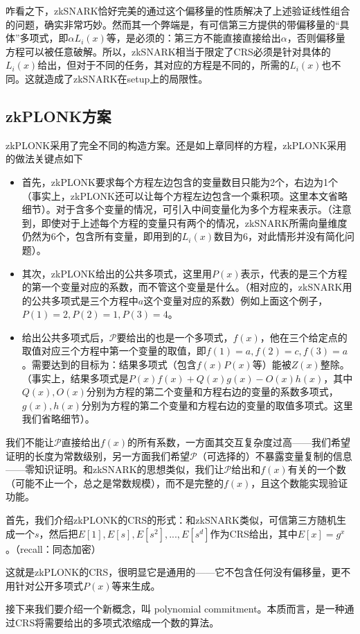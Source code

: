 \documentclass[12pt]{article}
\newcommand{\zk}{zkPLONK}
\newcommand{\pp}{$\mathcal{P}$}
\begin{document}
咋看之下，zkSNARK恰好完美的通过这个偏移量的性质解决了上述验证线性组合的问题，确实非常巧妙。然而其一个弊端是，有可信第三方提供的带偏移量的“具体”多项式，即$\alpha L_i(x)$等，是必须的：第三方不能直接直接给出$\alpha$，否则偏移量方程可以被任意破解。所以，zkSNARK相当于限定了CRS必须是针对具体的$L_i(x)$给出，但对于不同的任务，其对应的方程是不同的，所需的$L_i(x)$也不同。这就造成了zkSNARK在setup上的局限性。

\subsection{\zk 方案}
\zk 采用了完全不同的构造方案。还是如上章同样的方程，\zk 采用的做法关键点如下
\begin{itemize}
	\item 首先，\zk 要求每个方程左边包含的变量数目只能为2个，右边为1个（事实上，\zk 还可以让每个方程左边包含一个乘积项。这里本文省略细节）。对于含多个变量的情况，可引入中间变量化为多个方程来表示。（注意到，即使对于上述每个方程的变量只有两个的情况，zkSNARK所需向量维度仍然为6个，包含所有变量，即用到的$L_i(x)$数目为6，对此情形并没有简化问题）。
	\item 其次，\zk 给出的公共多项式，这里用$P(x)$表示，代表的是三个方程的第一个变量对应的系数，而不管这个变量是什么。（相对应的，zkSNARK用的公共多项式是三个方程中$a$这个变量对应的系数）例如上面这个例子，$P(1)=2,P(2)=1,P(3)=4$。
	\item 给出公共多项式后，\pp 要给出的也是一个多项式，$f(x)$，他在三个给定点的取值对应三个方程中第一个变量的取值，即$f(1)=a,f(2)=c,f(3)=a$。需要达到的目标为：结果多项式（包含$f(x)P(x)$等）能被$Z(x)$整除。（事实上，结果多项式是$P(x)f(x)+Q(x)g(x)-O(x)h(x)$，其中$Q(x),O(x)$分别为方程的第二个变量和方程右边的变量的系数多项式，$g(x),h(x)$分别为方程的第二个变量和方程右边的变量的取值多项式。这里我们省略细节）。
\end{itemize}
我们不能让\pp 直接给出$f(x)$的所有系数，一方面其交互复杂度过高——我们希望证明的长度为常数级别，另一方面我们希望\pp （可选择的）不暴露变量复制的信息——零知识证明。和zkSNARK的思想类似，我们让\pp 给出和$f(x)$有关的一个数（可能不止一个，总之是常数规模），而不是完整的$f(x)$，且这个数能实现验证功能。

首先，我们介绍\zk 的CRS的形式：和zkSNARK类似，可信第三方随机生成一个$s$，然后把$E[1],E[s],E[s^2],...,E[s^d]$作为CRS给出，其中$E[x]=g^x$。（recall：同态加密）

这就是\zk 的CRS，很明显它是通用的——它不包含任何没有偏移量，更不用针对公开多项式$P(x)$等来生成。

接下来我们要介绍一个新概念，叫 polynomial commitment。本质而言，是一种通过CRS将需要给出的多项式浓缩成一个数的算法。
\end{document}
